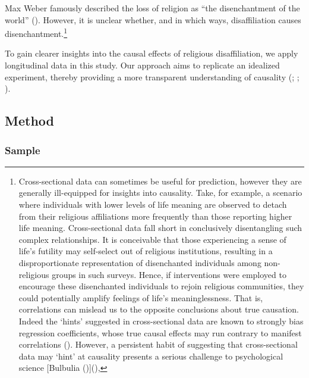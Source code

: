 \documentclass[
  singlecolumn,
  9pt]{article}
\begin{document}
Max Weber famously described the loss of religion as ``the
disenchantment of the world'' (). However, it is unclear whether, and in which ways,
disaffiliation causes disenchantment.\footnote{Cross-sectional data can
  sometimes be useful for prediction, however they are generally
  ill-equipped for insights into causality. Take, for example, a
  scenario where individuals with lower levels of life meaning are
  observed to detach from their religious affiliations more frequently
  than those reporting higher life meaning. Cross-sectional data fall
  short in conclusively disentangling such complex relationships. It is
  conceivable that those experiencing a sense of life's futility may
  self-select out of religious institutions, resulting in a
  disproportionate representation of disenchanted individuals among
  non-religious groups in such surveys. Hence, if interventions were
  employed to encourage these disenchanted individuals to rejoin
  religious communities, they could potentially amplify feelings of
  life's meaninglessness. That is, correlations can mislead us to the
  opposite conclusions about true causation. Indeed the `hints'
  suggested in cross-sectional data are known to strongly bias
  regression coefficients, whose true causal effects may run contrary to
  manifest correlations (). However, a persistent habit of suggesting that
  cross-sectional data may `hint' at causality presents a serious
  challenge to psychological science {[}Bulbulia
  (){]}(),}

To gain clearer insights into the causal effects of religious
disaffiliation, we apply longitudinal data in this study. Our approach
aims to replicate an idealized experiment, thereby providing a more
transparent understanding of causality
(;
;
).

\subsection{Method}\label{method}

\subsubsection{Sample}\label{sample}
\end{document}
